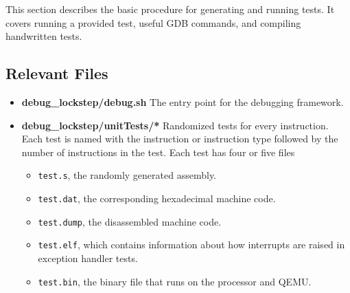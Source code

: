 This section describes the basic procedure for generating and running tests. 
It covers running a provided test, useful GDB commands, and compiling handwritten tests.

\subsection{Relevant Files}
\begin{itemize}
\item \textbf{debug\_lockstep/debug.sh} The entry point for the debugging framework. 
\item \textbf{debug\_lockstep/unitTests/*} Randomized tests for every instruction. 
Each test is named with the instruction or instruction type followed by the number of instructions in the test. 
Each test has four or five files
\begin{itemize}
\item \texttt{test.s}, the randomly generated assembly.
\item\texttt{test.dat}, the corresponding hexadecimal machine code.
\item \texttt{test.dump}, the disassembled machine code.
\item \texttt{test.elf}, which contains information about how interrupts are raised in exception handler tests.
\item \texttt{test.bin}, the binary file that runs on the processor and QEMU.
\end{itemize}

\end{itemize}

